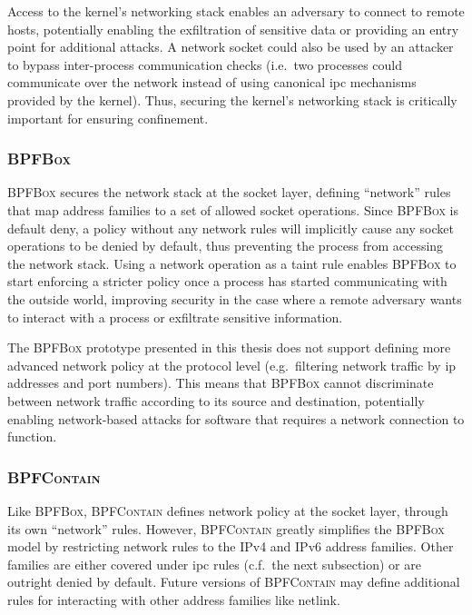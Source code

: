 \documentclass[
  fontsize=12pt,
  titlepage=firstiscover,
  paper=letter,
oneside,
  cleardoublepage=plain,
  parskip=half-,
  DIV=10,
  parindent,
  appendixprefix,
  chapterprefix,
  listof=totoc,
]{scrbook}
\newcommand{\bpfbox}{\textsc{BPFBox}}
\newcommand{\bpfcontain}{\textsc{BPFContain}}
\begin{document}
Access to the kernel's networking stack enables an adversary to connect to remote hosts,
potentially enabling the exfiltration of sensitive data or providing an entry point for
additional attacks. A network socket could also be used by an attacker to bypass
inter-process communication checks (i.e.\ two processes could communicate over the network
instead of using canonical \gls{ipc} mechanisms provided by the kernel). Thus, securing
the kernel's networking stack is critically important for ensuring confinement.


\subsubsection{\bpfbox{}}

\bpfbox{} secures the network stack at the socket layer, defining \enquote{network} rules
that map address families to a set of allowed socket operations. Since \bpfbox{} is
default deny, a policy without any network rules will implicitly cause any socket
operations to be denied by default, thus preventing the process from accessing the network
stack. Using a network operation as a taint rule enables \bpfbox{} to start enforcing
a stricter policy once a process has started communicating with the outside world,
improving security in the case where a remote adversary wants to interact with a process
or exfiltrate sensitive information.

The \bpfbox{} prototype presented in this thesis does not support defining more advanced
network policy at the protocol level (e.g.\ filtering network traffic by \gls{ip} addresses
and port numbers). This means that \bpfbox{} cannot discriminate between network traffic
according to its source and destination, potentially enabling network-based attacks for
software that requires a network connection to function.


\subsubsection{\bpfcontain{}}

Like \bpfbox{}, \bpfcontain{} defines network policy at the socket layer, through its own
\enquote{network} rules. However, \bpfcontain{} greatly simplifies the \bpfbox{} model by
restricting network rules to the IPv4 and IPv6 address families. Other families are either
covered under \gls{ipc} rules (c.f.\ the next subsection) or are outright denied by
default. Future versions of \bpfcontain{} may define additional rules for interacting with
other address families like netlink.
\end{document}
